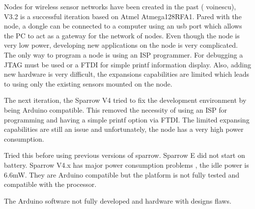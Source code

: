 Nodes for wireless sensor networks have been created in the past ( voinescu), V3.2 is a successful
iteration based on Atmel Atmega128RFA1. Pared with the node, a dongle can be connected to a
computer using an usb port which allows the PC to act as a gateway for the network of nodes. Even
though the node is very low power, developing new applications on the node is very complicated. The
only way to program a node is using an ISP programmer. For debugging a JTAG must be used or a FTDI
for simple printf information display. Also, adding new hardware is very difficult, the expansions
    capabilities are limited which leads to using only the existing sensors mounted on the node.

The next iteration, the Sparrow V4 tried to fix the development environment by being Arduino
compatible. This removed the necessity of using an ISP for programming and having a simple printf
option via FTDI. The limited expansing capabilities are still an issue and unfortunately, the node
has a very high power consumption.


Tried this before using previous versions of sparrow. Sparrow E did not start on battery. Sparrow
V4.x has major power consumption problems , the idle power is 6.6mW. They are Arduino compatible but the platform is not fully tested and compatible with the processor.

The Arduino software not fully developed and hardware with designs flaws.
